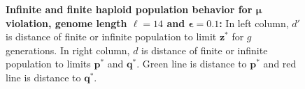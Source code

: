 \begin{figure}[h]
\begin{center}
\hspace{-3em}%
\vspace{-0.5em} \hspace{-3em}%


\caption[\textbf{Infinite and finite haploid population behavior for $\bm{\mu}$ violation, genome length $\ell = 14$ and $\bm{\epsilon} = 0.1$}]{\textbf{Infinite and finite haploid population behavior for $\bm{\mu}$ violation, genome length $\ell = 14$ and $\bm{\epsilon} = 0.1$:} 
  In left column, $d'$ is distance of finite or infinite population to limit $\bm{z}^\ast$ for $g$ generations. In right column, $d$ is distance of finite or infinite population to limits $\bm{p}^\ast$ and $\bm{q}^\ast$. Green line is distance to $\bm{p}^\ast$ and red line is distance to $\bm{q}^\ast$.}
\label{oscillation_14h_vio_mu_0.1}
\end{center}
\end{figure}

